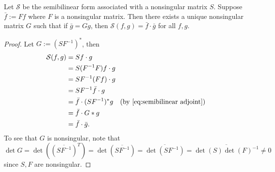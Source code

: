 \documentclass[11pt, oneside, a4paper]{article}
\begin{document}
\begin{prop}\cite[p.287]{CoddingtonLevinson}\label{prop:unique nonsingular G in semibilinear form}
    Let $\mathcal{S}$ be the semibilinear form associated with a nonsingular matrix $S$. Suppose $\bar{f}:=Ff$ where $F$ is a nonsingular matrix. Then there exists a unique nonsingular matrix $G$ such that if $\bar{g}=Gg$, then $\mathcal{S}(f,g)=\bar{f}\cdot \bar{g}$ for all $f, g$.
\end{prop}
\begin{proof}
    Let $G:=(SF^{-1})^*$, then
    \begin{align*}
        \mathcal{S}(f,g) &= Sf\cdot g\\
        &= S(F^{-1}F)f\cdot g\\
        &= SF^{-1}(Ff)\cdot g\\
        &= SF^{-1}\bar{f} \cdot g\\
        &= \bar{f}\cdot (SF^{-1})^*g \quad\mbox{(by \eqref{eq:semibilinear adjoint})}\\
        &= \bar{f}\cdot G*g\\
        &= \bar{f}\cdot \bar{g}.
    \end{align*}
    To see that $G$ is nonsingular, note that $\det G = \det((\overline{SF^{-1}})^T) = \det(\overline{SF^{-1}}) = \overline{\det(SF^{-1})} = \overline{\det(S)\det(F)^{-1}}\neq 0$ since $S, F$ are nonsingular.
\end{proof}
\end{document}
